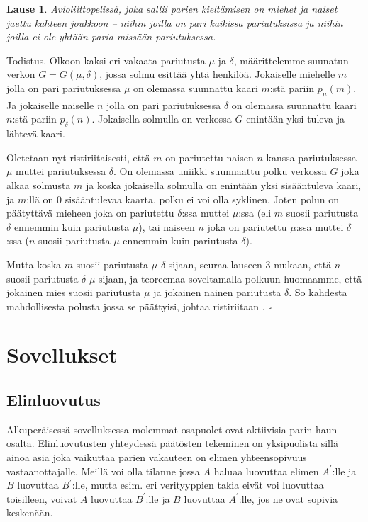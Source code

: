 \documentclass[finnish]{tktltiki2}
\newtheorem{lau}{Lause}
\theoremstyle{definition}
\theoremstyle{remark}
\begin{document}
\begin{lau}
Avioliittopelissä, joka sallii parien kieltämisen on miehet ja naiset jaettu kahteen joukkoon -- niihin joilla on pari kaikissa pariutuksissa ja niihin joilla ei ole yhtään paria missään pariutuksessa.
\end{lau}

Todistus. Olkoon kaksi eri vakaata pariutusta $\mu$ ja $\delta$, määrittelemme suunatun verkon $G = G(\mu, \delta)$, jossa solmu esittää yhtä henkilöä. Jokaiselle miehelle $m$ jolla on pari pariutuksessa $\mu$ on olemassa suunnattu kaari $m$:stä pariin $p_{\mu}(m)$. Ja jokaiselle naiselle $n$ jolla on pari pariutuksessa $\delta$ on olemassa suunnattu kaari $n$:stä pariin $p_{\delta}(n)$.
Jokaisella solmulla on verkossa $G$ enintään yksi tuleva ja lähtevä kaari.

Oletetaan nyt ristiriitaisesti, että $m$ on pariutettu naisen $n$ kanssa pariutuksessa $\mu$ muttei pariutuksessa $\delta$. On olemassa uniikki suunnaattu polku verkossa $G$ joka alkaa solmusta $m$ ja koska jokaisella solmulla on enintään yksi sisääntuleva kaari, ja $m$:llä on 0 sisääntulevaa kaarta, polku ei voi olla syklinen. Joten polun on päätyttävä mieheen joka on pariutettu $\delta$:ssa muttei $\mu$:ssa (eli $m$ suosii pariutusta $\delta$ ennemmin kuin pariutusta $\mu$), tai naiseen $n$ joka on pariutettu $\mu$:ssa muttei $\delta$:ssa ($n$ suosii pariutusta $\mu$ ennemmin kuin pariutusta $\delta$).

Mutta koska $m$ suosii pariutusta $\mu$ $\delta$ sijaan, seuraa lauseen 3 mukaan, että $n$ suosii pariutusta $\delta$ $\mu$ sijaan, ja teoreemaa soveltamalla polkuun huomaamme, että jokainen mies suosii pariutusta $\mu$ ja jokainen nainen pariutusta $\delta$. So kahdesta mahdollisesta polusta jossa se päättyisi, johtaa ristiriitaan \cite[p. 27]{gusfield1989stable}. $\square$


\section{Sovellukset}
\subsection{Elinluovutus}
Alkuperäisessä sovelluksessa molemmat osapuolet ovat aktiivisia parin haun osalta. Elinluovutusten yhteydessä päätösten tekeminen on yksipuolista sillä ainoa asia joka vaikuttaa parien vakauteen on elimen yhteensopivuus vastaanottajalle. Meillä voi olla tilanne jossa $A$ haluaa luovuttaa elimen $A^{'}$:lle ja $B$ luovuttaa $B^{'}$:lle, mutta esim. eri verityyppien takia eivät voi luovuttaa toisilleen, voivat $A$ luovuttaa $B^{'}$:lle ja $B$ luovuttaa $A^{'}$:lle, jos ne ovat sopivia keskenään.
\end{document}
